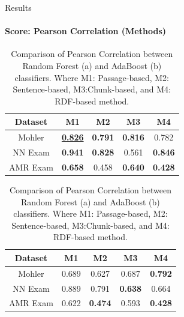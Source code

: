 \documentclass[aspectratio=169]{beamer}
\begin{document}
\begin{frame}{Results}
	\framesubtitle{Score: Pearson Correlation (Methods)}
\begin{table}
	\begin{subtable}[c]{0.5\textwidth}
		\centering
		\begin{tabular}{|c|c|c|c|c|}
			\hline
			Dataset & M1 & M2 & M3 & M4 \\
			\hline
			Mohler \cite{} & \underline{\textbf{0.826}}  &\textbf{0.791} &\textbf{0.816} &0.782 \\
			\hline
			NN Exam \cite{} &\textbf{0.941} &\textbf{0.828} &0.561 &\textbf{0.846} \\
			\hline
			AMR Exam \cite{} &\textbf{0.658} &0.458 &\textbf{0.640} & \textbf{0.428} \\
			\hline
		\end{tabular}
		\subcaption{}
	\end{subtable}
	\begin{subtable}[c]{0.5\textwidth}
		\centering
		\begin{tabular}{|c|c|c|c|c|}
			\hline
			Dataset & M1 & M2 & M3 & M4 \\
			\hline
			Mohler \cite{} &0.689  &0.627 &0.687 &\textbf{0.792} \\
			\hline
			NN Exam \cite{} &0.889 &0.791 &\textbf{0.638} &0.664 \\
			\hline
			AMR Exam \cite{} &0.622 &\textbf{0.474} &0.593 &\textbf{0.428} \\
			\hline
		\end{tabular}	
		\subcaption{}
	\end{subtable}
	\caption{Comparison of Pearson Correlation between Random Forest (a) and AdaBoost (b) classifiers. Where M1: Passage-based, M2: Sentence-based, M3:Chunk-based, and M4: RDF-based method.}
\end{table}
\end{frame}
\end{document}
